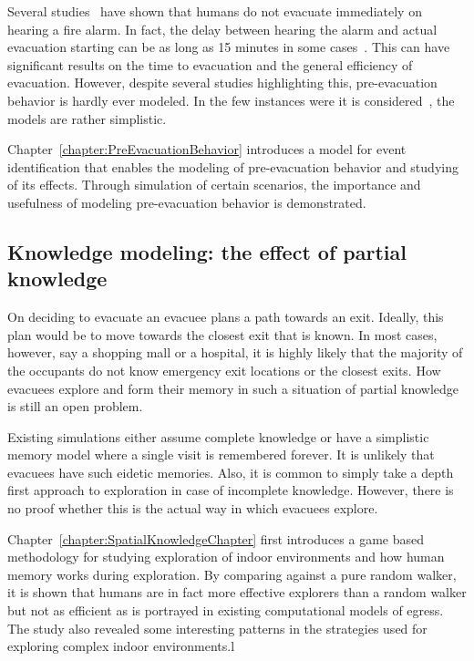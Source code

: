     Several studies~\cite{Kuligowski:2009un} have shown that humans do not evacuate immediately on hearing a fire alarm. In fact, the delay between hearing the alarm and actual evacuation starting can be as long as 15 minutes in some cases~\cite{15MinuteDelayStudy}. This can have significant results on the time to evacuation and the general efficiency of evacuation. However, despite several studies highlighting this, pre-evacuation behavior is hardly ever modeled. In the few instances were it is considered~\cite{PreEvacModel}, the models are rather simplistic.

    Chapter~\ref{chapter:PreEvacuationBehavior} introduces a model for event identification that enables the modeling of pre-evacuation behavior and studying of its effects. Through simulation of certain scenarios, the importance and usefulness of modeling pre-evacuation behavior is demonstrated.


\subsection{Knowledge modeling: the effect of partial knowledge}
\label{IBEVAC:EnvironmentKnowledgeShortcomings}

    On deciding to evacuate an evacuee plans a path towards an exit. Ideally, this plan would be to move towards the closest exit that is known. In most cases, however, say a shopping mall or a hospital, it is highly likely that the majority of the occupants do not know emergency exit locations or the closest exits. How evacuees explore and form their memory in such a situation of partial knowledge is still an open problem.

    Existing simulations either assume complete knowledge or have a simplistic memory model where a single visit is remembered forever. It is unlikely that evacuees have such eidetic memories. Also, it is common to simply take a depth first approach to exploration in case of incomplete knowledge. However, there is no proof whether this is the actual way in which evacuees explore.

    Chapter~\ref{chapter:SpatialKnowledgeChapter} first introduces a game based methodology for studying exploration of indoor environments and how human memory works during exploration. By comparing against a pure random walker, it is shown that humans are in fact more effective explorers than a random walker but not as efficient as is portrayed in existing computational models of egress. The study also revealed some interesting patterns in the strategies used for exploring complex indoor environments.l


